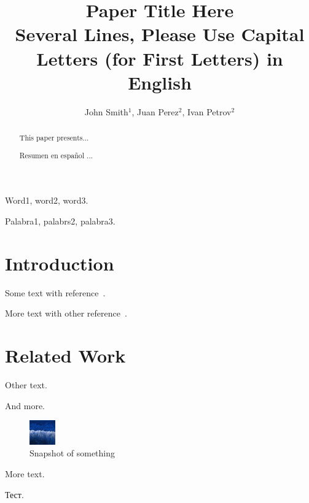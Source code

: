 \documentclass{cys}
\title{Paper Title Here \\ Several Lines, Please Use Capital Letters (for First Letters) in English}
\author{John Smith$^1$, Juan Perez$^2$, Ivan Petrov$^2$}
\affil{ 
$^1$ Insitute, Faculty, City, \authorcr   %
Country             
\authorcr \authorcr
$^2$ Insitute, Faculty, City, \authorcr
Country             
\authorcr  \authorcr
author1@xxx.xx, author2@xxx.xx
\authorcr  \authorcr
}
\begin{document}
\maketitle

\renewcommand{\tablename}{Table}

\begin{abstract}
This paper presents...
\end{abstract}

\begin{keywords} 
Word1, word2, word3.
\end{keywords} 



\begin{abstract}
Resumen en español ...
\end{abstract}

\begin{keywords} 
Palabra1, palabrs2, palabra3.
\end{keywords} 


\section{Introduction}
\label{sec:introduction}
Some text with reference~\cite{hulth:2003}.

More text with other reference~\cite{rose:2010}.


\section{Related Work}
\label{sec:relatedWork}

Other text.

And more.

\begin{figure}[ht]
\centering
\includegraphics[width=0.1\textwidth]{foto.JPG}
\caption{Snapshot of something}
\label{jdm1}
\end{figure}

More text.

Тест.  
\end{document}
